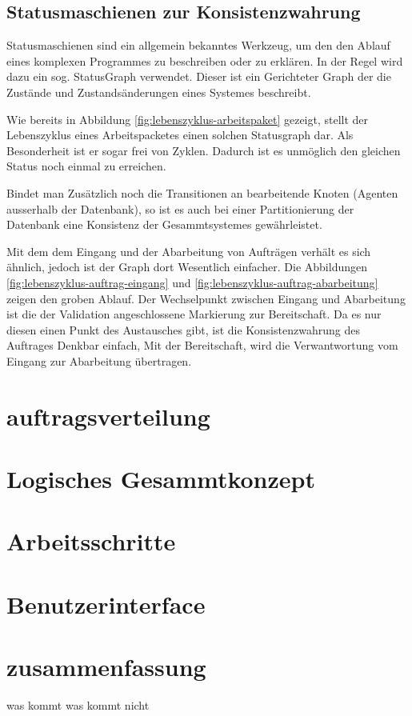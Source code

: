 

\subsection{Statusmaschienen zur Konsistenzwahrung}

\nocite{statechart}

Statusmaschienen sind ein allgemein bekanntes Werkzeug,
um den den Ablauf eines komplexen Programmes zu beschreiben oder zu erkl\"aren.
In der Regel wird dazu ein sog. StatusGraph verwendet.
Dieser ist ein Gerichteter Graph der die Zust\"ande und Zustands\"anderungen eines Systemes beschreibt.

Wie bereits in Abbildung \ref{fig:lebenszyklus-arbeitspaket} gezeigt,
stellt der Lebenszyklus eines Arbeitspacketes einen solchen Statusgraph dar.
Als Besonderheit ist er sogar frei von Zyklen.
Dadurch ist es unm\"oglich den gleichen Status noch einmal zu erreichen.

Bindet man Zus\"atzlich noch die Transitionen an bearbeitende Knoten (Agenten ausserhalb der Datenbank),
so ist es auch bei einer Partitionierung der Datenbank eine Konsistenz der Gesammtsystemes gew\"ahrleistet.



Mit dem dem Eingang und der Abarbeitung von Auftr\"agen verh\"alt es sich \"ahnlich,
jedoch ist der Graph dort Wesentlich einfacher.
Die Abbildungen \ref{fig:lebenszyklus-auftrag-eingang} und \ref{fig:lebenszyklus-auftrag-abarbeitung} zeigen den groben Ablauf.
Der Wechselpunkt zwischen Eingang und Abarbeitung ist die der Validation angeschlossene Markierung zur Bereitschaft.
Da es nur diesen einen Punkt des Austausches gibt, ist die Konsistenzwahrung des Auftrages Denkbar einfach,
Mit der Bereitschaft, wird die Verwantwortung vom Eingang zur Abarbeitung \"ubertragen.


\section{auftragsverteilung}

\section{Logisches Gesammtkonzept}


\section{Arbeitsschritte}

\section{Benutzerinterface}



\section{zusammenfassung}

was kommt
was kommt nicht
